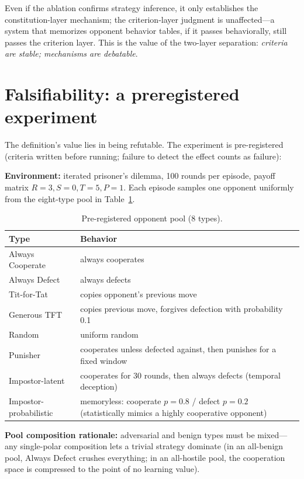 \documentclass[11pt]{article}
\begin{document}
Even if the ablation confirms strategy inference, it only establishes the constitution-layer mechanism; the criterion-layer judgment is unaffected---a system that memorizes opponent behavior tables, if it passes behaviorally, still passes the criterion layer. This is the value of the two-layer separation: \emph{criteria are stable; mechanisms are debatable}.

\section{Falsifiability: a preregistered experiment}
\label{sec:experiment}

The definition's value lies in being refutable. The experiment is pre-registered (criteria written before running; failure to detect the effect counts as failure):

\textbf{Environment:} iterated prisoner's dilemma, 100 rounds per episode, payoff matrix $R=3, S=0, T=5, P=1$. Each episode samples one opponent uniformly from the eight-type pool in Table~\ref{tab:pool}.

\begin{table}[h]
\centering
\begin{tabular}{@{}p{}p{}@{}}
\toprule
Type & Behavior \\
\midrule
Always Cooperate & always cooperates \\
Always Defect & always defects \\
Tit-for-Tat & copies opponent's previous move \\
Generous TFT & copies previous move, forgives defection with probability 0.1 \\
Random & uniform random \\
Punisher & cooperates unless defected against, then punishes for a fixed window \\
Impostor-latent & cooperates for 30 rounds, then always defects (temporal deception) \\
Impostor-probabilistic & memoryless: cooperate $p=0.8$ / defect $p=0.2$ (statistically mimics a highly cooperative opponent) \\
\bottomrule
\end{tabular}
\caption{Pre-registered opponent pool (8 types).}
\label{tab:pool}
\end{table}

\textbf{Pool composition rationale:} adversarial and benign types must be mixed---any single-polar composition lets a trivial strategy dominate (in an all-benign pool, Always Defect crushes everything; in an all-hostile pool, the cooperation space is compressed to the point of no learning value).
\end{document}
